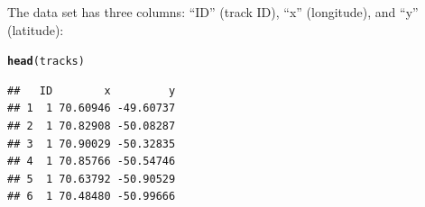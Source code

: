 \documentclass[12pt]{article}\usepackage[]{graphicx}\usepackage[]{xcolor}
\makeatletter
\newcommand{\hldef}[1]{\textcolor[rgb]{0.345,0.345,0.345}{#1}}%
\newcommand{\hlkwd}[1]{\textcolor[rgb]{0.737,0.353,0.396}{\textbf{#1}}}%
\newenvironment{kframe}{%
 \def\at@end@of@kframe{}%
 \ifinner\ifhmode%
  \def\at@end@of@kframe{\end{minipage}}%
  \begin{minipage}{\columnwidth}%
 \fi\fi%
 \def\FrameCommand##1{\hskip\@totalleftmargin \hskip-\fboxsep
 \colorbox{shadecolor}{##1}\hskip-\fboxsep
     \hskip-\linewidth \hskip-\@totalleftmargin \hskip\columnwidth}%
 \MakeFramed {\advance\hsize-\width
   \@totalleftmargin\z@ \linewidth\hsize
   \@setminipage}}%
 {\par\unskip\endMakeFramed%
 \at@end@of@kframe}
\newenvironment{knitrout}{}{} %
\makeatother
\begin{document}
The data set has three columns: ``ID'' (track ID), ``x'' (longitude), and ``y'' (latitude):

\begin{knitrout}
\color{fgcolor}\begin{kframe}
\begin{alltt}
\hlkwd{head}\hldef{(tracks)}
\end{alltt}
\begin{verbatim}
##   ID        x         y
## 1  1 70.60946 -49.60737
## 2  1 70.82908 -50.08287
## 3  1 70.90029 -50.32835
## 4  1 70.85766 -50.54746
## 5  1 70.63792 -50.90529
## 6  1 70.48480 -50.99666
\end{verbatim}
\end{kframe}
\end{knitrout}
\end{document}
